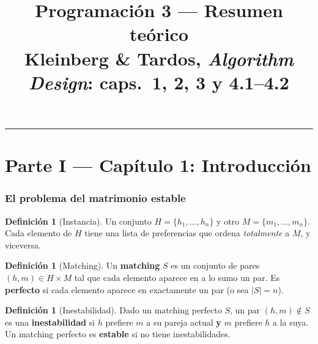\documentclass[11pt,a4paper]{article}
\title{\textbf{Programación 3 --- Resumen teórico}\\[2pt]
       \large Kleinberg \& Tardos, \emph{Algorithm Design}: caps.\ 1, 2, 3 y 4.1--4.2}
\author{}
\date{}
\theoremstyle{plain}
\theoremstyle{definition}
\newtheorem{definicion}[teorema]{Definición}
\theoremstyle{remark}
\begin{document}
\maketitle
\vspace{-3.5em}

\begin{center}\small
{}
\end{center}

\tableofcontents
\bigskip\hrule

\part*{Parte I --- Capítulo 1: Introducción}
\setcounter{section}{0}

\section{El problema del matrimonio estable}

\begin{definicion}[Instancia]
Un conjunto $H=\{h_1,\dots,h_n\}$ y otro $M=\{m_1,\dots,m_n\}$. Cada elemento de $H$
tiene una lista de preferencias que ordena \emph{totalmente} a $M$, y viceversa.
\end{definicion}

\begin{definicion}[Matching]
Un \textbf{matching} $S$ es un conjunto de pares $(h,m)\in H\times M$ tal que cada
elemento aparece en a lo sumo un par. Es \textbf{perfecto} si cada elemento aparece en
exactamente un par (o sea $|S|=n$).
\end{definicion}

\begin{definicion}[Inestabilidad]
Dado un matching perfecto $S$, un par $(h,m)\notin S$ es una \textbf{inestabilidad} si
$h$ prefiere $m$ a su pareja actual \textbf{y} $m$ prefiere $h$ a la suya. Un matching
perfecto es \textbf{estable} si no tiene inestabilidades.
\end{definicion}
\end{document}
